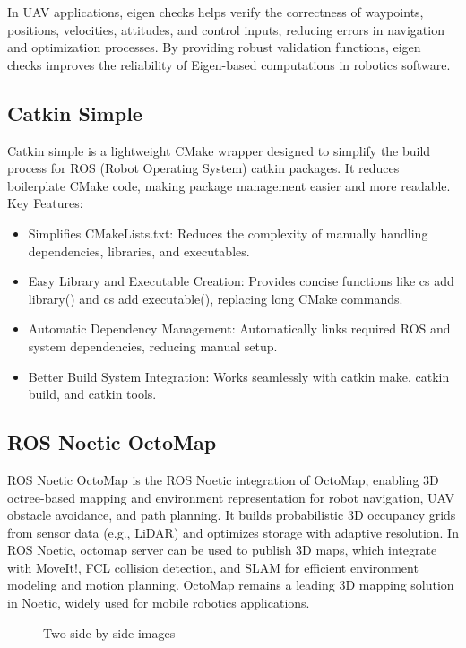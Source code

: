 \documentclass{article}
\begin{document}
In UAV applications, eigen checks helps verify the correctness of waypoints, positions, velocities, attitudes, and control inputs, reducing errors in navigation and optimization processes.
By providing robust validation functions, eigen checks improves the reliability of Eigen-based computations in robotics software.


\subsection{Catkin Simple}
Catkin simple is a lightweight CMake wrapper designed to simplify the build process for ROS (Robot Operating System) catkin packages. It reduces boilerplate CMake code, making package management easier and more readable.
Key Features:
\begin{itemize}
    \item Simplifies CMakeLists.txt: Reduces the complexity of manually handling dependencies, libraries, and executables.
    \item Easy Library and Executable Creation: Provides concise functions like cs add library() and cs add executable(), replacing long CMake commands.
    \item Automatic Dependency Management: Automatically links required ROS and system dependencies, reducing manual setup.
    \item Better Build System Integration: Works seamlessly with catkin make, catkin build, and catkin tools.
\end{itemize}

\subsection{ROS Noetic OctoMap}
ROS Noetic OctoMap is the ROS Noetic integration of OctoMap, enabling 3D octree-based mapping and environment representation for robot navigation, UAV obstacle avoidance, and path planning. It builds probabilistic 3D occupancy grids from sensor data (e.g., LiDAR) and optimizes storage with adaptive resolution. In ROS Noetic, octomap server can be used to publish 3D maps, which integrate with MoveIt!, FCL collision detection, and SLAM for efficient environment modeling and motion planning. OctoMap remains a leading 3D mapping solution in Noetic, widely used for mobile robotics applications.

\begin{figure}[h]
    \centering
    \caption{Two side-by-side images}
    \label{fig:two_images}
\end{figure}
\end{document}
